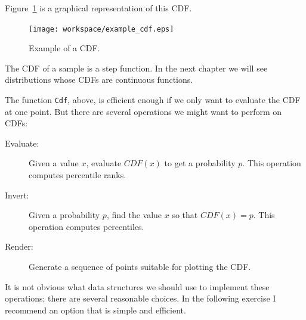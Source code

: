\documentclass[12pt]{book}
\begin{document}
Figure~\ref{example_cdf} is a graphical representation of this CDF.

\begin{figure}
\centerline{\texttt{[image: workspace/example\_cdf.eps]}}
\caption{Example of a CDF.}
\label{example_cdf}
\end{figure}

The CDF of a sample is a step function.  In the next chapter we
will see distributions whose CDFs are continuous functions.  

The function {\tt Cdf}, above, is efficient enough if we only want
to evaluate the CDF at one point.  But there are several operations
we might want to perform on CDFs:

\begin{description}

\item[Evaluate:] Given a value $x$, evaluate $CDF(x)$ to get a
  probability $p$.  This operation computes percentile ranks.

\item[Invert:] Given a probability $p$, find the value $x$ so that
  $CDF(x) = p$.  This operation computes percentiles.

\item[Render:] Generate a sequence of points suitable for plotting the
  CDF.

\end{description}

It is not obvious what data structures we should use to implement
these operations; there are several reasonable choices.  In the
following exercise I recommend an option that is simple and efficient.
\end{document}
